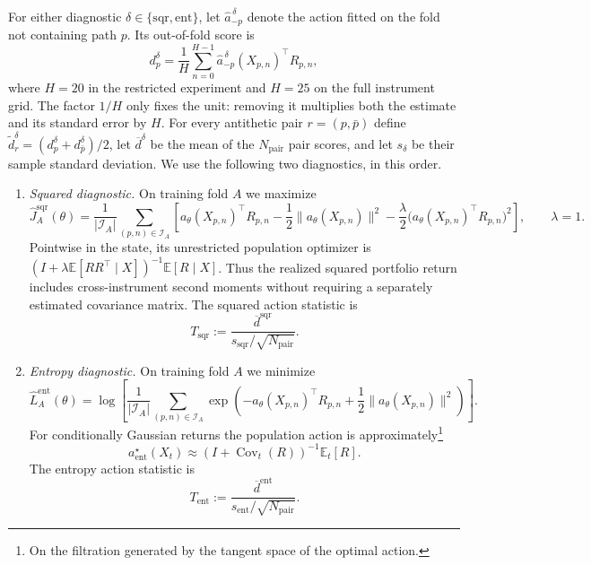 \documentclass[11pt]{article}
\newcommand{\E}{\mathbb E}
\newcommand{\abs}[1]{\lvert #1\rvert}
\theoremstyle{plain}
\theoremstyle{definition}
\theoremstyle{remark}
\begin{document}
For either diagnostic $\delta\in\{\mathrm{sqr},\mathrm{ent}\}$, let
$\widehat a_{-p}^{\,\delta}$ denote the action fitted on the fold not
containing path $p$.  Its out-of-fold score is
\begin{equation}\label{eq:numerics-action-path-score}
d_p^\delta
=\frac1H\sum_{n=0}^{H-1}
\widehat a_{-p}^{\,\delta}(X_{p,n})^\top R_{p,n},
\end{equation}
where $H=20$ in the restricted experiment and $H=25$ on the full instrument
grid.  The factor $1/H$ only fixes the unit: removing it multiplies both the
estimate and its standard error by $H$.  For every antithetic pair
$r=(p,\bar p)$ define
$\widetilde d_r^\delta=(d_p^\delta+d_{\bar p}^\delta)/2$, let
$\overline d^\delta$ be the mean of the $N_{\mathrm{pair}}$ pair scores, and
let $s_\delta$ be their sample standard deviation.  We use the following two
diagnostics, in this order.

\begin{enumerate}[label=(\roman*)]
\item \emph{Squared diagnostic.}
On training fold $A$ we maximize
\begin{equation}\label{eq:numerics-squared-objective}
\widehat J_A^{\mathrm{sqr}}(\theta)
=\frac{1}{\abs{\mathcal I_A}}
\sum_{(p,n)\in\mathcal I_A}
\left[
a_\theta(X_{p,n})^\top R_{p,n}
-\frac12\lVert a_\theta(X_{p,n})\rVert^2
-\frac{\lambda}{2}
\bigl(a_\theta(X_{p,n})^\top R_{p,n}\bigr)^2
\right],
\qquad \lambda=1.
\end{equation}
Pointwise in the state, its unrestricted population optimizer is
$(I+\lambda\E[RR^\top\mid X])^{-1}\E[R\mid X]$.  Thus the realized squared
portfolio return includes cross-instrument second moments without requiring
a separately estimated covariance matrix.  The squared action statistic is
\begin{equation}\label{eq:numerics-t-sqr}
T_{\mathrm{sqr}}
:=\frac{\overline d^{\mathrm{sqr}}}
{s_{\mathrm{sqr}}/\sqrt{N_{\mathrm{pair}}}}.
\end{equation}

\item \emph{Entropy diagnostic.}
On training fold $A$ we minimize
\begin{equation}\label{eq:numerics-entropy-objective}
\widehat L_A^{\mathrm{ent}}(\theta)
=\log\!\left[
\frac{1}{\abs{\mathcal I_A}}
\sum_{(p,n)\in\mathcal I_A}
\exp\!\left(
-a_\theta(X_{p,n})^\top R_{p,n}
+\frac12\lVert a_\theta(X_{p,n})\rVert^2
\right)
\right].
\end{equation}
For conditionally Gaussian returns the population action is
approximately\footnote{On the filtration generated by the tangent space of
the optimal action.}
\[
a_{\mathrm{ent}}^\star(X_t)
\approx (I+\operatorname{Cov}_t(R))^{-1}\E_t[R].
\]
The entropy action statistic is
\begin{equation}\label{eq:numerics-t-ent}
T_{\mathrm{ent}}
:=\frac{\overline d^{\mathrm{ent}}}
{s_{\mathrm{ent}}/\sqrt{N_{\mathrm{pair}}}}.
\end{equation}
\end{enumerate}
\end{document}
